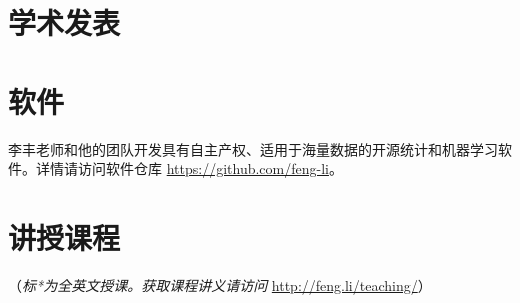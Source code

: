 \documentclass[twoside,a4paper,10.5pt]{article}
\begin{document}
\section*{学术发表}
\begin{refsection}

\nocite{li2022bayesian_ijf}
\nocite{wang2022escalator_safety}
\nocite{wang2022distributed_ijf}
\nocite{anderer2022forecasting_ijf}
\nocite{janeway2021clinical_jad}
\nocite{petropoulos2021forecasting_ijf}
\nocite{kang2022forecast_ejor}
\nocite{pan2021note_jbes}
\nocite{talagala2022fformpp_ijf}
\nocite{zhu2021least_jcgs}
\nocite{wang2022uncertainty_jors}
\nocite{kang2021deja_jbr}
\nocite{hao2020bilinear_ced}
\nocite{li2020forecasting_eswa}
\nocite{kang2020gratis_sam}
\nocite{kang2020statscompcn}
\nocite{li2020fppcn}
\nocite{kalesan2020intersections_jsr}
\nocite{bailey2019changes_plosone}
\nocite{li2019credit_cef}
\nocite{li2018improving_ijf}
\nocite{pino2018cohort_bmj}
\nocite{li2016distributedcn}
\nocite{li2013bayesian}
\nocite{li2013efficient_sjs}
\nocite{li2011modeling_mixtures}
\nocite{li2010flexible_jspi}

\printbibliography[heading=none]
\end{refsection}

\section*{软件}
李丰老师和他的团队开发具有自主产权、适用于海量数据的开源统计和机器学习软件。详情请访问软件仓库 \url{https://github.com/feng-li}。

\section*{讲授课程}
（\emph{标*为全英文授课。获取课程讲义请访问} \url{http://feng.li/teaching/}）
\end{document}
